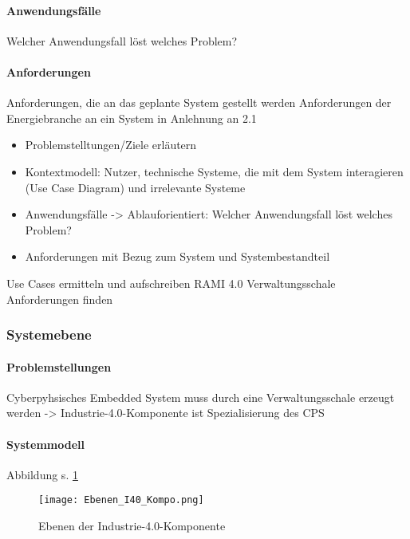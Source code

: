 \paragraph{Anwendungsfälle}
Welcher Anwendungsfall löst welches Problem?

\paragraph{Anforderungen}
Anforderungen, die an das geplante System gestellt werden
Anforderungen der Energiebranche an ein System in Anlehnung an 2.1

\begin{itemize}
  \item Problemstelltungen/Ziele erläutern
  \item Kontextmodell: Nutzer, technische Systeme, die mit dem System interagieren (Use Case Diagram) und irrelevante Systeme
  \item Anwendungsfälle -> Ablauforientiert: Welcher Anwendungsfall löst welches Problem?
  \item Anforderungen mit Bezug zum System und Systembestandteil
\end{itemize}
Use Cases ermitteln und aufschreiben
RAMI 4.0 Verwaltungsschale Anforderungen finden



\subsubsection{Systemebene}

\paragraph{Problemstellungen}

Cyberpyhsisches Embedded System muss durch eine Verwaltungsschale erzeugt werden -> Industrie-4.0-Komponente ist Spezialisierung des CPS

\paragraph{Systemmodell}

Abbildung s. \ref{ebenen_i40}

\begin{figure}[h]
  \centering
  \texttt{[image: Ebenen\_I40\_Kompo.png]}
  \caption[Ebenen der Industrie-4.0-Komponente]{Ebenen der Industrie-4.0-Komponente \citep[S. 52]{BITKOM2015}}
  \label{ebenen_i40}
\end{figure}

